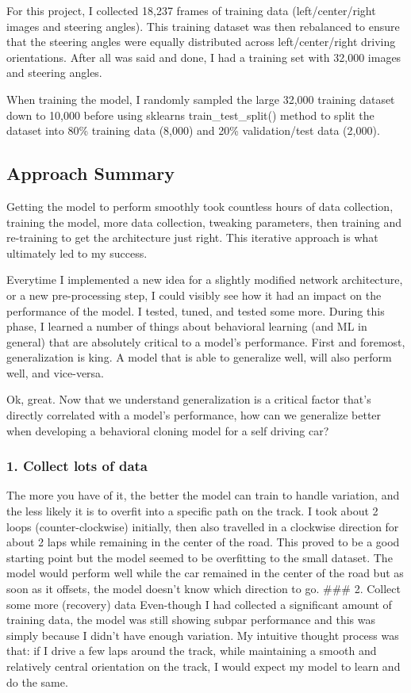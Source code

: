 \documentclass[11pt]{article}
\begin{document}
For this project, I collected 18,237 frames of training data
(left/center/right images and steering angles). This training dataset
was then rebalanced to ensure that the steering angles were equally
distributed across left/center/right driving orientations. After all was
said and done, I had a training set with 32,000 images and steering
angles.

When training the model, I randomly sampled the large 32,000 training
dataset down to 10,000 before using sklearns train\_test\_split() method
to split the dataset into 80\% training data (8,000) and 20\%
validation/test data (2,000).

\subsection{Approach Summary}\label{approach-summary}

Getting the model to perform smoothly took countless hours of data
collection, training the model, more data collection, tweaking
parameters, then training and re-training to get the architecture just
right. This iterative approach is what ultimately led to my success.

Everytime I implemented a new idea for a slightly modified network
architecture, or a new pre-processing step, I could visibly see how it
had an impact on the performance of the model. I tested, tuned, and
tested some more. During this phase, I learned a number of things about
behavioral learning (and ML in general) that are absolutely critical to
a model's performance. First and foremost, generalization is king. A
model that is able to generalize well, will also perform well, and
vice-versa.

Ok, great. Now that we understand generalization is a critical factor
that's directly correlated with a model's performance, how can we
generalize better when developing a behavioral cloning model for a self
driving car?

\subsubsection{1. Collect lots of data}\label{collect-lots-of-data}

The more you have of it, the better the model can train to handle
variation, and the less likely it is to overfit into a specific path on
the track. I took about 2 loops (counter-clockwise) initially, then also
travelled in a clockwise direction for about 2 laps while remaining in
the center of the road. This proved to be a good starting point but the
model seemed to be overfitting to the small dataset. The model would
perform well while the car remained in the center of the road but as
soon as it offsets, the model doesn't know which direction to go. \#\#\#
2. Collect some more (recovery) data Even-though I had collected a
significant amount of training data, the model was still showing subpar
performance and this was simply because I didn't have enough variation.
My intuitive thought process was that: if I drive a few laps around the
track, while maintaining a smooth and relatively central orientation on
the track, I would expect my model to learn and do the same.
\end{document}
